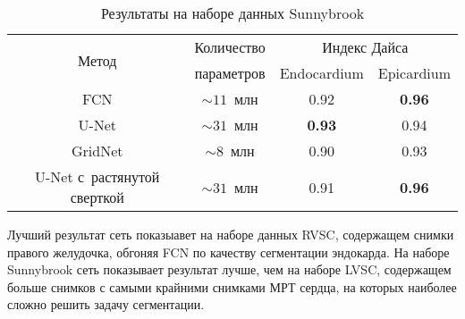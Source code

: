 \begin{table}[h]
\begin{center}
    \caption{Результаты на наборе данных Sunnybrook} \label{tab:sunnybrook_results}
    \begin{tabular}{ |c||*{3}{c|} }
      \hline
      \multirow{2}{*}{Метод}      & Количество   & \multicolumn{2}{c|}{Индекс Дайса} \\ \cline{3-4}
                                  & параметров   & Endocardium   & Epicardium        \\ \hline
      \hline
      FCN                         & $\sim11$~млн & 0.92          & \textbf{0.96}     \\ \hline
      U-Net                       & $\sim31$~млн & \textbf{0.93} & 0.94              \\ \hline
      GridNet                     &  $\sim8$~млн & 0.90          & 0.93              \\ \hline
      U-Net с~растянутой сверткой & $\sim31$~млн & 0.91          & \textbf{0.96}     \\ 
      \hline
    \end{tabular}
  \end{center}
\end{table}

Лучший результат сеть показыавет на наборе данных RVSC, содержащем снимки правого желудочка, 
обгоняя FCN по качеству сегментации эндокарда. На наборе Sunnybrook сеть показывает результат
лучше, чем на наборе LVSC, содержащем больше снимков с самыми крайними снимками МРТ сердца,
на которых наиболее сложно решить задачу сегментации.
